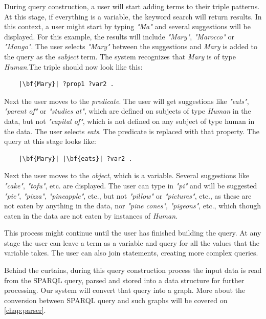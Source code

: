 \begin{example}
During query construction, a user will start adding terms to their triple patterns. 
At this stage, if everything is a variable, the keyword search will return results. 
In this context, a user might start by typing \textit{"Ma"} and several suggestions will be displayed. 
For this example, the results will include \textit{"Mary"}, \textit{"Marocco"} or \textit{"Mango"}. 
The user selects \textit{"Mary"} between the suggestions and \textit{Mary} is added to the query as the \textit{subject} term. 
The system recognizes that \textit{Mary} is of type \textit{Human}.The triple should now look like this:

\begin{verbatim}
    |\bf{Mary}| ?prop1 ?var2 .
\end{verbatim}

Next the user moves to the \textit{predicate}. 
The user will get suggestions like \textit{"eats"}, \textit{"parent of"} or \textit{"studies at"}, which are defined on subjects of type \textit{Human} in the data, but not \textit{"capital of"}, which is not defined on any subject of type human in the data. 
The user selects \textit{eats}. The predicate is replaced with that property. 
The query at this stage looks like:

\begin{verbatim}
    |\bf{Mary}| |\bf{eats}| ?var2 .
\end{verbatim}

Next the user moves to the \textit{object}, which is a variable. 
Several suggestions like \textit{"cake"}, \textit{"tofu"}, etc. are displayed. 
The user can type in \textit{"pi"} and will be suggested \textit{"pie"}, \textit{"pizza"}, \textit{"pineapple"}, etc., but not \textit{"pillow"} or \textit{"pictures"}, etc., as these are not eaten by anything in the data, nor \textit{"pine cones"}, \textit{"pigeons"}, etc., which though eaten in the data are not eaten by instances of \textit{Human}.

This process might continue until the user has finished building the query. 
At any stage the user can leave a term as a variable and query for all the values that the variable takes.
The user can also join statements, creating more complex queries.

Behind the curtains, during this query construction process the input data is read from the SPARQL query, parsed and stored into a data structure for further processing. 
Our system will convert that query into a graph. 
More about the conversion between SPARQL query and such graphs will be covered on \autoref{chap:parser}.


\end{example}
